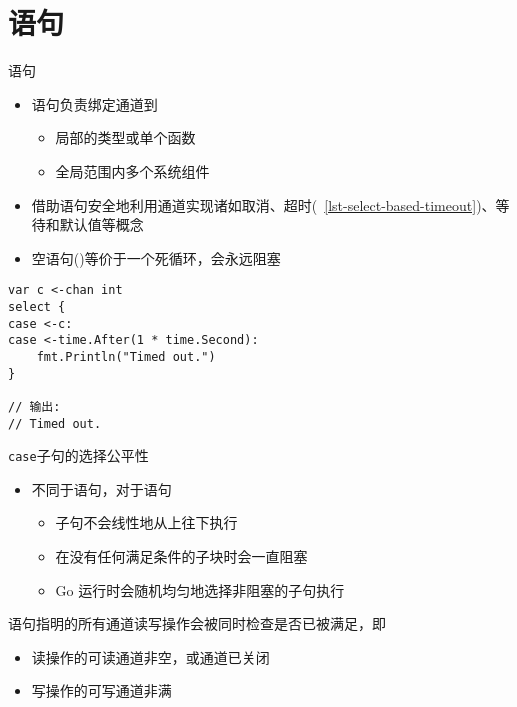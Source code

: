 \section{\select 语句}
\begin{frame}[fragile]{\select 语句}
    \begin{itemize}
        \item \select 语句负责绑定通道到
            \begin{itemize}
                \item 局部的类型或单个函数
                \item 全局范围内多个系统组件
            \end{itemize}
        \item 借助\select 语句安全地利用通道实现诸如\alert{取消}、\alert{超时}(\lstlistingname~\ref{lst-select-based-timeout})、\alert{等待}和\alert{默认值}等概念
        \item 空\select 语句()等价于一个死循环，会永远阻塞
    \end{itemize}

\begin{lstlisting}[caption={基于\select 实现超时退出},label=lst-select-based-timeout]
var c <-chan int
select {
case <-c:
case <-time.After(1 * time.Second):
    fmt.Println("Timed out.")
}

// 输出:
// Timed out.
\end{lstlisting}
    
\end{frame}

\begin{frame}{\texttt{case}子句的选择公平性}
    \begin{itemize}
        \item 不同于语句，对于\select 语句
            \begin{itemize}
                \item {}子句不会线性地从上往下执行
                \item 在没有任何满足条件的子块时会一直阻塞
                \item Go 运行时会随机均匀地选择非阻塞的子句执行
            \end{itemize}
    \end{itemize}

语句指明的所有通道读写操作会被同时检查是否已被满足，即
\begin{itemize}
    \item 读操作的可读通道非空，或通道已关闭 
    \item 写操作的可写通道非满
\end{itemize}

\end{frame}

